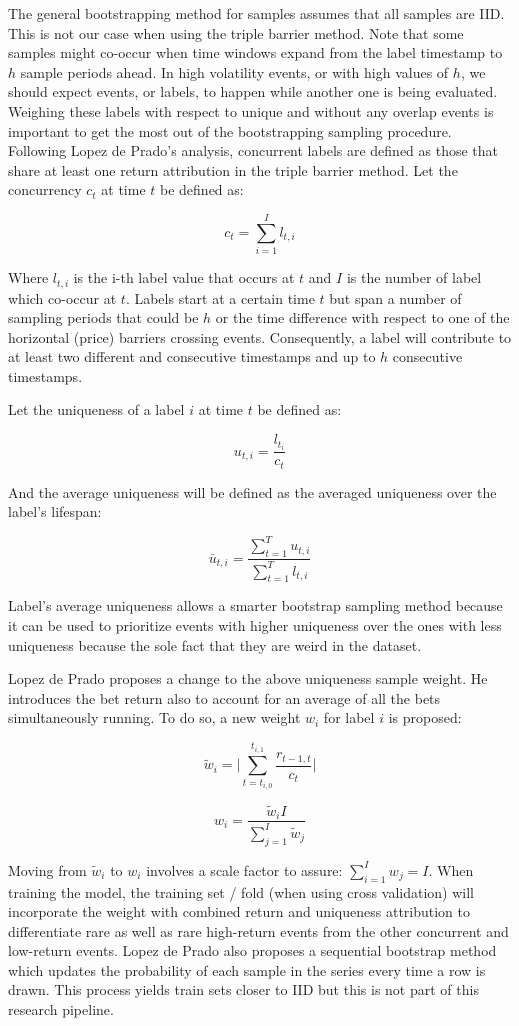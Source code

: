 The general bootstrapping method for samples assumes that all samples are IID.
This is not our case when using the triple barrier method.
Note that some samples might co-occur when time windows expand from the label
timestamp to $h$ sample periods ahead. In high volatility events, or with high
values of $h$, we should expect events, or labels, to happen while another one
is being evaluated. Weighing these labels with respect to unique and without any
overlap events is important to get the most out of the bootstrapping sampling
procedure. Following Lopez de Prado's analysis, concurrent labels are defined as
those that share at least one return attribution in the triple barrier method. 
Let the concurrency $c_t$ at time $t$ be defined as:

\[c_t = \sum_{i=1}^I l_{t,i}\]

Where $l_{t,i}$ is the i-th label value that occurs at $t$ and $I$ is the number of
label which co-occur at $t$. Labels start at a certain time $t$ but span a
number of sampling periods that could be $h$ or the time difference with respect
to one of the horizontal (price) barriers crossing events. Consequently, a label
will contribute to at least two different and consecutive timestamps and up to
$h$ consecutive timestamps.

Let the uniqueness of a label $i$ at time $t$ be defined as:

\[u_{t,i} = \frac{l_{t_i}}{c_t}\]

And the average uniqueness will be defined as the averaged uniqueness over the
label's lifespan:

\[\bar{u}_{t,i} = \frac{\sum_{t=1}^{T} u_{t,i}}{\sum_{t=1}^{T} l_{t,i}}\]

Label's average uniqueness allows a smarter bootstrap sampling method because it
can be used to prioritize events with higher uniqueness over the ones with less
uniqueness because the sole fact that they are weird in the dataset.

Lopez de Prado proposes a change to the above uniqueness sample weight. He
introduces the bet return also to account for an average of all the bets
simultaneously running. To do so, a new weight $w_i$ for label $i$ is proposed:

\[ \tilde{w}_i =\big| \sum_{t=t_{i,0}}^{t_{i,1}} \frac{r_{t-1,t}}{c_t} \big|\]

\[ w_i = \frac{\tilde{w}_i I}{\sum_{j=1}^{I} \tilde{w}_j}\]

Moving from $\tilde{w}_i$ to $w_i$ involves a scale factor to assure:
$\sum_{i=1}^{I} w_j = I$. When training the model, the training set / fold (when
using cross validation) will incorporate the weight with combined return and
uniqueness attribution to differentiate rare as well as rare high-return events
from the other concurrent and low-return events. Lopez de Prado also proposes a
sequential bootstrap method which updates the probability of each sample in the 
series every time a row is drawn. This process yields train sets closer to IID
but this is not part of this research pipeline.